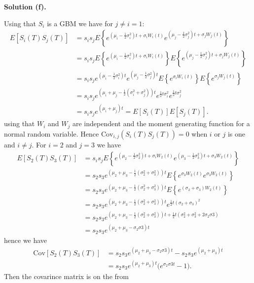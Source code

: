 \documentclass[a4paper,12pt,openany]{book}
\begin{document}
\noindent\makebox[\linewidth]{\rule{\textwidth}{0.4pt}}

\textbf{Solution (f).}

Using that \(S_i\) is a GBM we have for \(j\ne i=1\):
\begin{align*}
E[S_i(T)S_j(T)]&=s_is_jE\left\{e^{\left(\mu_i-\frac{1}{2}\sigma_i^2\right)t+\sigma_i W_i(t)}e^{\left(\mu_j-\frac{1}{2}\sigma_j^2\right)t+\sigma_j W_j(t)}\right\}\\
&=s_is_jE\left\{e^{\left(\mu_i-\frac{1}{2}\sigma_i^2\right)t+\sigma_i W_i(t)}\right\}E\left\{e^{\left(\mu_j-\frac{1}{2}\sigma_j^2\right)t+\sigma_j W_j(t)}\right\}\\
&=s_is_je^{\left(\mu_i-\frac{1}{2}\sigma_i^2\right)t}e^{\left(\mu_j-\frac{1}{2}\sigma_j^2\right)t}E\left\{e^{\sigma_i W_i(t)}\right\}E\left\{e^{\sigma_j W_j(t)}\right\}\\
&=s_is_je^{\left(\mu_i+\mu_j-\frac{1}{2}(\sigma_i^2+\sigma_j^2)\right)t}e^{\frac{1}{2}t\sigma_i^2}e^{\frac{1}{2}t\sigma_j^2}\\
&=s_is_je^{\left(\mu_i+\mu_j\right)t}=E[S_i(T)]E[S_j(T)].
\end{align*}
using that \(W_i\) and \(W_j\) are independent and the moment generating function for a normal random variable. Hence \(\text{Cov}_{i,j}(S_i(T)S_j(T))=0\) when \(i\) or \(j\) is one and \(i\ne j\). For \(i=2\) and \(j=3\) we have
\begin{align*}
E[S_2(T)S_3(T)]&=s_is_jE\left\{e^{\left(\mu_2-\frac{1}{2}\sigma_2^2\right)t+\sigma_i W_2(t)}e^{\left(\mu_3-\frac{1}{2}\sigma_3^2\right)t+\sigma_3 W_2(t)}\right\}\\
&=s_2s_3e^{\left(\mu_2+\mu_3-\frac{1}{2}(\sigma_2^2+\sigma_3^2)\right)t}E\left\{e^{\sigma_3 W_2(t)}e^{\sigma_3 W_2(t)}\right\}\\
&=s_2s_3e^{\left(\mu_2+\mu_3-\frac{1}{2}(\sigma_2^2+\sigma_3^2)\right)t}E\left\{e^{(\sigma_2 +\sigma_3 )W_2(t)}\right\}\\
&=s_2s_3e^{\left(\mu_2+\mu_3-\frac{1}{2}(\sigma_2^2+\sigma_3^2)\right)t}e^{\frac{1}{2}t(\sigma_2 +\sigma_3 )^2}\\
&=s_2s_3e^{\left(\mu_2+\mu_3-\frac{1}{2}(\sigma_2^2+\sigma_3^2)\right)t+\frac{1}{2}t(\sigma_2^2 +\sigma_3^2+2\sigma_2\sigma3 )}\\
&=s_2s_3e^{\left(\mu_2+\mu_3-\sigma_2\sigma3\right)t}
\end{align*}
hence we have
\begin{align*}
\text{Cov}[S_2(T)S_3(T)]&=s_2s_3e^{\left(\mu_2+\mu_3-\sigma_2\sigma3\right)t}-s_2s_3e^{(\mu_2+\mu_3)t}\\
&=s_2s_3e^{(\mu_2+\mu_3)t}\Big(e^{\sigma_2\sigma3t}-1\Big).
\end{align*}
Then the covarince matrix is on the from
\end{document}
